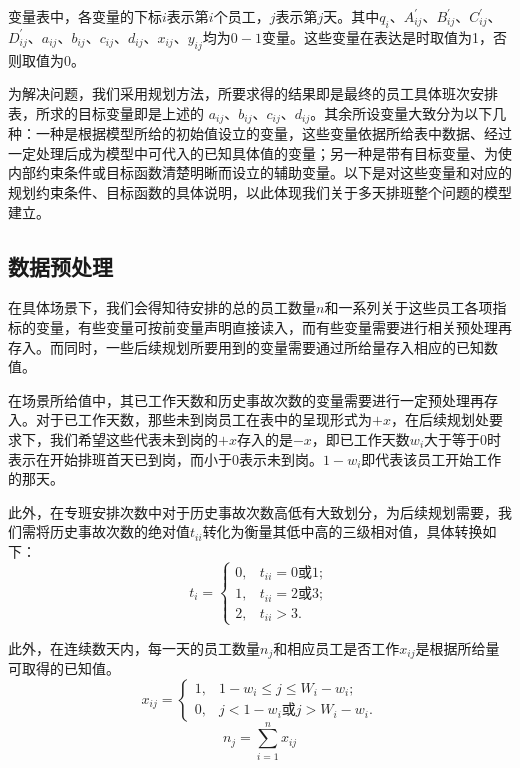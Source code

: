 \documentclass{article}
\begin{document}
	变量表中，各变量的下标$i$表示第$i$个员工，$j$表示第$j$天。其中$q_{i}$、$A_{ij}^{'}$、$B_{ij}^{'}$、$C_{ij}^{'}$、$D_{ij}^{'}$、$a_{ij}$、$b_{ij}$、$c_{ij}$、$d_{ij}$、$x_{ij}$、$y_{ij}$均为$0-1$变量。这些变量在表达是时取值为1，否则取值为0。
	
	为解决问题，我们采用规划方法，所要求得的结果即是最终的员工具体班次安排表，所求的目标变量即是上述的 $a_{ij}$、$b_{ij}$、$c_{ij}$、$d_{ij}$。其余所设变量大致分为以下几种：一种是根据模型所给的初始值设立的变量，这些变量依据所给表中数据、经过一定处理后成为模型中可代入的已知具体值的变量；另一种是带有目标变量、为使内部约束条件或目标函数清楚明晰而设立的辅助变量。以下是对这些变量和对应的规划约束条件、目标函数的具体说明，以此体现我们关于多天排班整个问题的模型建立。
	
	\subsection{数据预处理}
	在具体场景下，我们会得知待安排的总的员工数量$n$和一系列关于这些员工各项指标的变量，有些变量可按前变量声明直接读入，而有些变量需要进行相关预处理再存入。而同时，一些后续规划所要用到的变量需要通过所给量存入相应的已知数值。
	
	在场景所给值中，其已工作天数和历史事故次数的变量需要进行一定预处理再存入。对于已工作天数，那些未到岗员工在表中的呈现形式为$+x$，在后续规划处要求下，我们希望这些代表未到岗的$+x$存入的是$-x$，即已工作天数$w_{i}$大于等于0时表示在开始排班首天已到岗，而小于0表示未到岗。$1-w_{i}$即代表该员工开始工作的那天。
	
	此外，在专班安排次数中对于历史事故次数高低有大致划分，为后续规划需要，我们需将历史事故次数的绝对值$t_{ii}$转化为衡量其低中高的三级相对值，具体转换如下：
	\begin{equation}
		t_i = \begin{cases}
			0, & t_{ii} =0 \text{或} 1; \\
			1, & t_{ii} =2 \text{或} 3;\\
			2, & t_{ii} >3.
		\end{cases}
	\end{equation}
	
	此外，在连续数天内，每一天的员工数量$n_j$和相应员工是否工作$x_{ij}$是根据所给量可取得的已知值。
	\begin{equation}
		x_{ij} = \begin{cases}
			1, & 1-w_i\leq j \leq W_i-w_i; \\
			0, & j<1-w_i \text{或}j >W_i-w_i.
		\end{cases}
	\end{equation}
	\begin{equation}
		n_j=\sum_{i=1}^{n}x_{ij}
	\end{equation}
	
\end{document}
